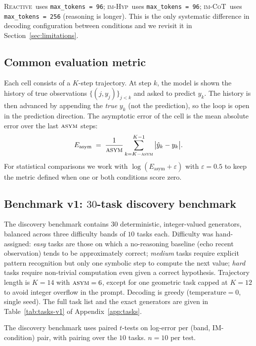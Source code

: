 \documentclass[11pt]{article}
\newcommand{\imhyp}{\textsc{im-Hyp}}
\newcommand{\imcot}{\textsc{im-CoT}}
\newcommand{\reactive}{\textsc{Reactive}}
\newcommand{\errk}{E_{\text{asym}}}
\begin{document}
\noindent
\reactive\ uses \verb|max_tokens = 96|; \imhyp\ uses
\verb|max_tokens = 96|; \imcot\ uses \verb|max_tokens = 256|
(reasoning is longer).  This is the only systematic difference in
decoding configuration between conditions and we revisit it in
Section~\ref{sec:limitations}.

\subsection{Common evaluation metric}
\label{sec:metric}

Each cell consists of a $K$-step trajectory.  At step $k$, the
model is shown the history of true observations $\{(j, y_j)\}_{j<k}$
and asked to predict $y_k$.  The history is then advanced by
appending the \emph{true} $y_k$ (not the prediction), so the loop
is open in the prediction direction.  The asymptotic error of the
cell is the mean absolute error over the last $\textsc{asym}$
steps:
\begin{equation}
  \errk \;=\; \frac{1}{\textsc{asym}}
  \sum_{k=K-\textsc{asym}}^{K-1} \big| \hat y_k - y_k \big|.
\end{equation}
For statistical comparisons we work with
$\log(\errk + \varepsilon)$ with $\varepsilon = 0.5$ to keep the
metric defined when one or both conditions score zero.

\subsection{Benchmark v1: $30$-task discovery benchmark}
\label{sec:method-v1}

The discovery benchmark contains $30$ deterministic, integer-valued
generators, balanced across three difficulty bands of $10$ tasks
each.  Difficulty was hand-assigned: \emph{easy} tasks are those
on which a no-reasoning baseline (echo recent observation) tends
to be approximately correct; \emph{medium} tasks require explicit
pattern recognition but only one symbolic step to compute the next
value; \emph{hard} tasks require non-trivial computation even given
a correct hypothesis.  Trajectory length is $K = 14$ with
$\textsc{asym} = 6$, except for one geometric task capped at $K = 12$
to avoid integer overflow in the prompt.  Decoding is greedy
($\text{temperature} = 0$, single seed).  The full task list and
the exact generators are given in Table~\ref{tab:tasks-v1} of
Appendix~\ref{app:tasks}.

The discovery benchmark uses paired $t$-tests on log-error per
(band, IM-condition) pair, with pairing over the $10$ tasks.
$n = 10$ per test.
\end{document}
